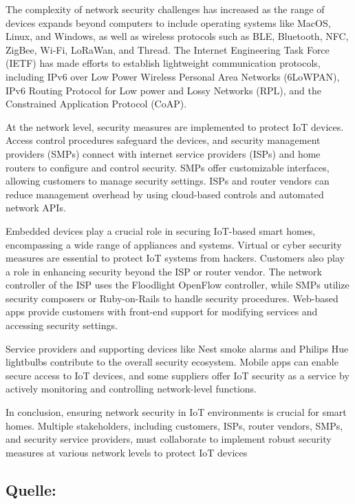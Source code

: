 The complexity of network security challenges has increased as the range of devices expands beyond computers to include operating systems like MacOS, Linux, and Windows, as well as wireless protocols such as BLE, Bluetooth, NFC, ZigBee, Wi-Fi, LoRaWan, and Thread. The Internet Engineering Task Force (IETF) has made efforts to establish lightweight communication protocols, including IPv6 over Low Power Wireless Personal Area Networks (6LoWPAN), IPv6 Routing Protocol for Low power and Lossy Networks (RPL), and the Constrained Application Protocol (CoAP).

At the network level, security measures are implemented to protect IoT devices. Access control procedures safeguard the devices, and security management providers (SMPs) connect with internet service providers (ISPs) and home routers to configure and control security. SMPs offer customizable interfaces, allowing customers to manage security settings. ISPs and router vendors can reduce management overhead by using cloud-based controls and automated network APIs.

Embedded devices play a crucial role in securing IoT-based smart homes, encompassing a wide range of appliances and systems. Virtual or cyber security measures are essential to protect IoT systems from hackers. Customers also play a role in enhancing security beyond the ISP or router vendor. The network controller of the ISP uses the Floodlight OpenFlow controller, while SMPs utilize security composers or Ruby-on-Rails to handle security procedures. Web-based apps provide customers with front-end support for modifying services and accessing security settings.

Service providers and supporting devices like Nest smoke alarms and Philips Hue lightbulbs contribute to the overall security ecosystem. Mobile apps can enable secure access to IoT devices, and some suppliers offer IoT security as a service by actively monitoring and controlling network-level functions.

In conclusion, ensuring network security in IoT environments is crucial for smart homes. Multiple stakeholders, including customers, ISPs, router vendors, SMPs, and security service providers, must collaborate to implement robust security measures at various network levels to protect IoT devices

\newpage
\subsection{Quelle: \cite{s23031252}}
